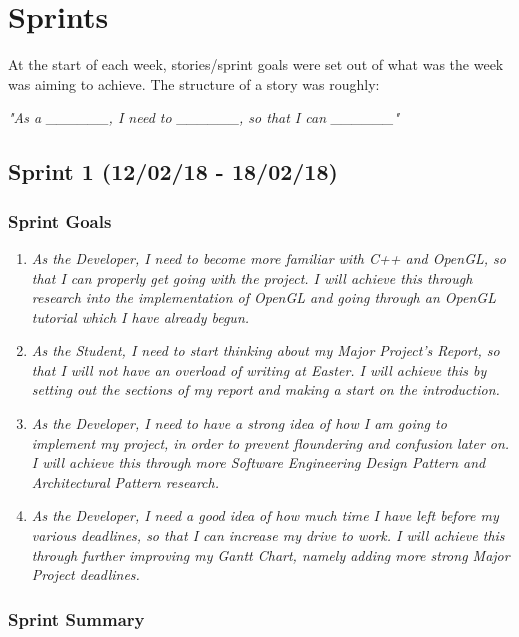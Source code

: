 \documentclass[a4paper,10pt]{report}
\begin{document}
\chapter{Sprints}

At the start of each week, stories/sprint goals were set out of what was the week was aiming to achieve. The structure of a story was roughly:\medskip

\textit{"As a \_\_\_\_\_\_, I need to \_\_\_\_\_\_, so that I can \_\_\_\_\_\_"}

\section{Sprint 1 (12/02/18 - 18/02/18)}

\subsection{Sprint Goals}

\begin{enumerate}
  \item \textit{As the Developer, I need to become more familiar with C++ and OpenGL, so that I can properly get going with the project. I will achieve this through research into the implementation of OpenGL and going through an OpenGL tutorial which I have already begun.}
  
  \item \textit{As the Student, I need to start thinking about my Major Project's Report, so that I will not have an overload of writing at Easter. I will achieve this by setting out the sections of my report and making a start on the introduction.}
  \item \textit{As the Developer, I need to have a strong idea of how I am going to implement my project, in order to prevent floundering and confusion later on. I will achieve this through more Software Engineering Design Pattern and Architectural Pattern research. }
\item \textit{As the Developer, I need a good idea of how much time I have left before my various deadlines, so that I can increase my drive to work. I will achieve this through further improving my Gantt Chart, namely adding more strong Major Project deadlines. }

\end{enumerate}

\subsection{Sprint Summary}
\end{document}

